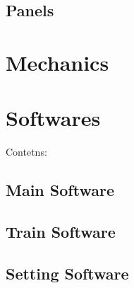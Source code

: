 \documentclass[letterpaper,10pt,english]{sphinxmanual}
\begin{document}
\section{Panels}
\label{\detokenize{Panels:panels}}\label{\detokenize{Panels::doc}}
\sphinxstepscope


\chapter{Mechanics}
\label{\detokenize{Mechanics:mechanics}}\label{\detokenize{Mechanics::doc}}
\sphinxstepscope


\chapter{Softwares}
\label{\detokenize{Software:softwares}}\label{\detokenize{Software::doc}}
\sphinxAtStartPar
Contetns:

\sphinxstepscope


\section{Main Software}
\label{\detokenize{Main Software:main-software}}\label{\detokenize{Main Software::doc}}
\sphinxstepscope


\section{Train Software}
\label{\detokenize{Train Software:train-software}}\label{\detokenize{Train Software::doc}}
\sphinxstepscope


\section{Setting Software}
\label{\detokenize{Setting Software:setting-software}}\label{\detokenize{Setting Software::doc}}
\end{document}
